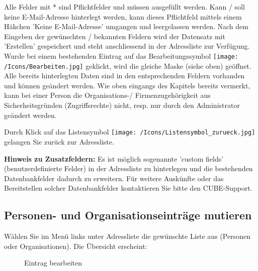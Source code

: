 
\vspace{\baselineskip}
Alle Felder mit * sind Pflichtfelder und müssen ausgefüllt werden. Kann / soll keine E-Mail-Adresse hinterlegt werden, kann dieses Pflichtfeld mittels einem Häkchen 'Keine E-Mail-Adresse'  umgangen und leergelassen werden. Nach dem Eingeben der gewünschten / bekannten Feldern wird der Datensatz mit 'Erstellen'  gespeichert und steht anschliessend in der Adressliste zur Verfügung. Wurde bei einem bestehenden Eintrag auf das Bearbeitungssymbol \texttt{[image: /Icons/Bearbeiten.jpg]} geklickt, wird die gleiche Maske (siehe oben) geöffnet. Alle bereits hinterlegten Daten sind in den entsprechenden Feldern vorhanden und können geändert werden. Wie oben eingangs des Kapitels bereits vermerkt, kann bei einer Person die Organisations-/ Firmenzugehörigkeit aus Sicherheitsgründen (Zugriffsrechte) nicht, resp. nur durch den Administrator geändert werden.

\vspace{\baselineskip}

Durch Klick auf das Listensymbol \texttt{[image: /Icons/Listensymbol\_zurueck.jpg]}  gelangen Sie zurück zur Adressliste.

\vspace{\baselineskip}

\textbf{Hinweis zu Zusatzfeldern:} Es ist möglich sogenannte 'custom fields' (benutzerdefinierte Felder) in der Adressliste zu hinterlegen und die bestehenden Datenbankfelder dadurch zu erweitern. Für weitere Auskünfte oder das Bereitstellen solcher Datenbankfelder kontaktieren Sie bitte den CUBE-Support.

\subsection{Personen- und Organisationseinträge mutieren}

Wählen Sie im Menü links unter Adressliste die gewünschte Liste aus (Personen oder Organisationen). Die Übersicht erscheint:

\begin{figure}[H]
\caption{Eintrag bearbeiten}
\end{figure}

